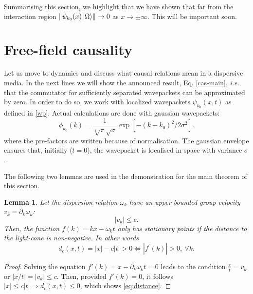 \documentclass[notitlepage, prx, preprint, amsmath,superscriptaddress,amssymb]{revtex4-1}
\newtheorem{lemma}{Lemma}[section]
\begin{document}
Summarising this section, we highlight that we have shown that far from the interaction region $\Vert{\psi_{k_0}(x)\ket{\Omega}}\Vert \to0$ as $x\to\pm\infty$.  This will be important soon.







\section{Free-field causality}

Let us move to dynamics and discuss what causal relations mean in a dispersive media.   In the next lines we will show the announced result, Eq. \eqref{cas-main}, \emph{i.e.} that  the commutator   for sufficiently separated wavepackets can be approximated by zero.    
In order to do so, we  work with localized wavepackets $\psi_{k_0}(x,t)$ as defined in \eqref{wp}.  Actual calculations are done with gaussian wavepackets:
\begin{equation}
\phi_{k_0}(k) = \frac{1}{\sqrt[4]{\pi}\sqrt{\sigma}}
\exp\left[-(k-k_0)^2/2\sigma^2\right].
\label{eq:gaussian}
\end{equation}
where the pre-factors are written because of normalisation.   The gaussian envelope ensures that, initially ($t=0$), the wavepacket is localised in space with variance $\sigma$.   


The following  two lemmas  are  used  in the demonstration for the main theorem of this section.

\begin{lemma}
\label{lemma:cones}
Let the dispersion relation $\omega_k$ have an upper bounded group velocity $v_k=\partial_k \omega_k$:
\begin{equation}
\vert  v_k \vert \leq c.
\end{equation}
Then, the function $f(k) = k x - \omega_k t$ only has stationary points if the distance to the light-cone is non-negative. In other words
\begin{equation}
d_c(x,t) =  | x | - c | t |  > 0 \Leftrightarrow | f^\prime (k) | > 0,\: \forall k.\label{eq:distance}
\end{equation}
\end{lemma}

\begin{proof}
Solving the equation $f'(k)=x - \partial_k \omega_k t = 0$ leads to the condition $\frac{x}{t} = v_k$ or  $|x/t|=|v_k|\leq c$. Then, provided $f'(k)=0$, it follows $|x|\leq c|t|\Rightarrow d_c(x,t)\leq 0$, which shows \eqref{eq:distance}.
\end{proof}
\end{document}

